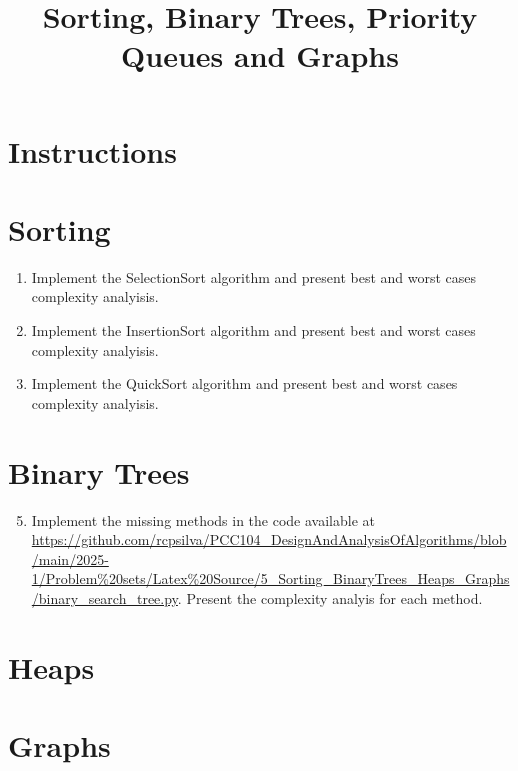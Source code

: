 \documentclass{article}
\title{Sorting, Binary Trees, Priority Queues and Graphs}
\author{}
\date{}
\begin{document}
\maketitle

\section*{Instructions}

\section*{Sorting}

\begin{enumerate}
    \item Implement the SelectionSort algorithm and present best and worst cases complexity analyisis.
    \item Implement the InsertionSort algorithm and present best and worst cases complexity analyisis.
    \item Implement the QuickSort algorithm and present best and worst cases complexity analyisis.  
\end{enumerate}

\section*{Binary Trees}

\begin{enumerate}
    \setcounter{enumi}{4}
    \item Implement the missing methods in the code available at \url{https://github.com/rcpsilva/PCC104_DesignAndAnalysisOfAlgorithms/blob/main/2025-1/Problem%20sets/Latex%20Source/5_Sorting_BinaryTrees_Heaps_Graphs/binary_search_tree.py}. Present the complexity analyis for each method.
\end{enumerate}

\section*{Heaps}

\section*{Graphs}
\end{document}
